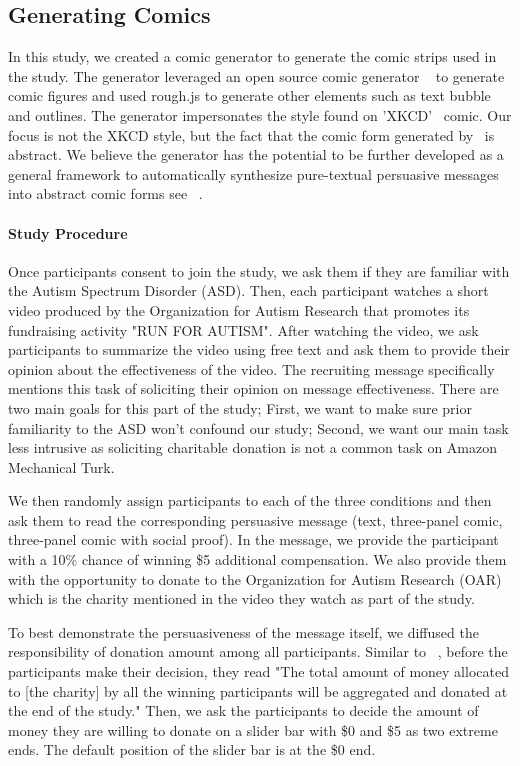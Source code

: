 \subsection{Generating Comics}
In this study, we created a comic generator to generate the comic strips used in the study. The generator leveraged an open source comic generator ~\cite{cmx.io} to generate comic figures and used rough.js to generate other elements such as text bubble and outlines. The generator impersonates the style found on 'XKCD'~\cite{munroe2009xkcd} comic. Our focus is not the XKCD style, but the fact that the comic form generated by~\cite{cmx.io} is abstract. We believe the generator has the potential to be further developed as a general framework to automatically synthesize pure-textual persuasive messages into abstract comic forms see ~.

\paragraph{Study Procedure} 
Once participants consent to join the study, we ask them if they are familiar with the Autism Spectrum Disorder (ASD). Then, each participant watches a short video produced by the Organization for Autism Research that promotes its fundraising activity "RUN FOR AUTISM". After watching the video, we ask participants to summarize the video using free text and ask them to provide their opinion about the effectiveness of the video. The recruiting message specifically mentions this task of soliciting their opinion on message effectiveness. There are two main goals for this part of the study; First, we want to make sure prior familiarity to the ASD won't confound our study; Second, we want our main task less intrusive as soliciting charitable donation is not a common task on Amazon Mechanical Turk.  

We then randomly assign participants to each of the three conditions and then ask them to read the corresponding persuasive message (text, three-panel comic, three-panel comic with social proof). In the message, we provide the participant with a 10\% chance of winning \$5 additional compensation. We also provide them with the opportunity to donate to the Organization for Autism Research (OAR) which is the charity mentioned in the video they watch as part of the study.

To best demonstrate the persuasiveness of the message itself, we diffused the responsibility of donation amount among all participants. Similar to ~\textcite{lee2013does}, before the participants make their decision, they read "The total amount of money allocated to [the charity] by all the winning participants will be aggregated and donated at the end of the study." Then, we ask the participants to decide the amount of money they are willing to donate on a slider bar with \$0 and \$5 as two extreme ends. The default position of the slider bar is at the \$0 end.

